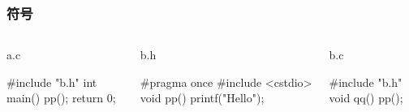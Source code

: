 \documentclass[UTF8,lualatex]{ctexbeamer}
\begin{document}
\begin{frame}[fragile,t]
    \frametitle{符号}
    \scriptsize
    \begin{columns}[t]
        \begin{column}{.3\textwidth}
            \begin{exampleblock}{a.c}
                \begin{cppcode}
                    #include "b.h"
                    int main() {
                        pp();
                        return 0;
                    }
                \end{cppcode}
            \end{exampleblock}
        \end{column}
        \begin{column}{.33\textwidth}
            \begin{exampleblock}{b.h}
                \begin{cppcode}
                    #pragma once
                    #include <cstdio>
                    void pp() {
                        printf("Hello\n");
                    }
                \end{cppcode}
            \end{exampleblock}
        \end{column}
        \begin{column}{.33\textwidth}
            \begin{exampleblock}{b.c}
                \begin{cppcode}
                    #include "b.h"
                    void qq() {
                        pp();
                    }
                \end{cppcode}
            \end{exampleblock}
        \end{column}
    \end{columns}
    \begin{block}{~}
    \end{block}
\end{frame}
\end{document}
